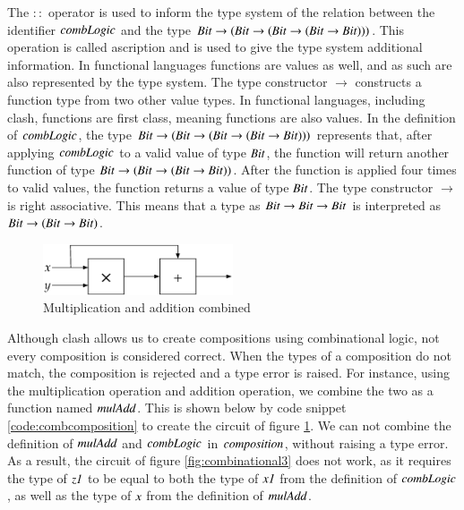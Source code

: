 The \ensuremath{\mathbin{::}} operator is used to inform the type system of the relation between the identifier \ensuremath{\Varid{combLogic}} and the type \ensuremath{\Conid{Bit}\to (\Conid{Bit}\to (\Conid{Bit}\to (\Conid{Bit}\to \Conid{Bit})))}.
This operation is called ascription and is used to give the type system additional information. 
In functional languages functions are values as well, and as such are also represented by the type system.
The type constructor \ensuremath{\to } constructs a function type from two other value types.
In functional languages, including \gls{clash}, functions are first class, meaning functions are also values.
In the definition of \ensuremath{\Varid{combLogic}}, the type \ensuremath{\Conid{Bit}\to (\Conid{Bit}\to (\Conid{Bit}\to (\Conid{Bit}\to \Conid{Bit})))} represents that, after applying \ensuremath{\Varid{combLogic}} to a valid value of type \ensuremath{\Conid{Bit}}, the function will return another function of type \ensuremath{\Conid{Bit}\to (\Conid{Bit}\to (\Conid{Bit}\to \Conid{Bit}))}.
After the function is applied four times to valid values, the function returns a value of type \ensuremath{\Conid{Bit}}.
The type constructor \ensuremath{\to } is right associative.
This means that a type as \ensuremath{\Conid{Bit}\to \Conid{Bit}\to \Conid{Bit}} is interpreted as \ensuremath{\Conid{Bit}\to (\Conid{Bit}\to \Conid{Bit})}.

\begin{figure}[H]
\begin{center}
\centering
\includegraphics[width=0.5\textwidth]{images/muladd}
\end{center}
\caption{Multiplication and addition combined} \label{fig:muladd}
\end{figure}

Although \gls{clash} allows us to create compositions using combinational logic, not every composition is considered correct.
When the types of a composition do not match, the composition is rejected and a type error is raised.
For instance, using the multiplication operation and addition operation, we combine the two as a function named \ensuremath{\Varid{mulAdd}}.
This is shown below by code snippet \ref{code:combcomposition} to create the circuit of figure \ref{fig:muladd}.
We can not combine the definition of \ensuremath{\Varid{mulAdd}} and \ensuremath{\Varid{combLogic}} in \ensuremath{\Varid{composition}}, without raising a type error.
As a result, the circuit of figure \ref{fig:combinational3} does not work, as it requires the type of \ensuremath{\Varid{z1}} to be equal to both the type of \ensuremath{\Varid{x1}} from the definition of \ensuremath{\Varid{combLogic}}, as well as the type of \ensuremath{\Varid{x}} from the definition of \ensuremath{\Varid{mulAdd}}.

